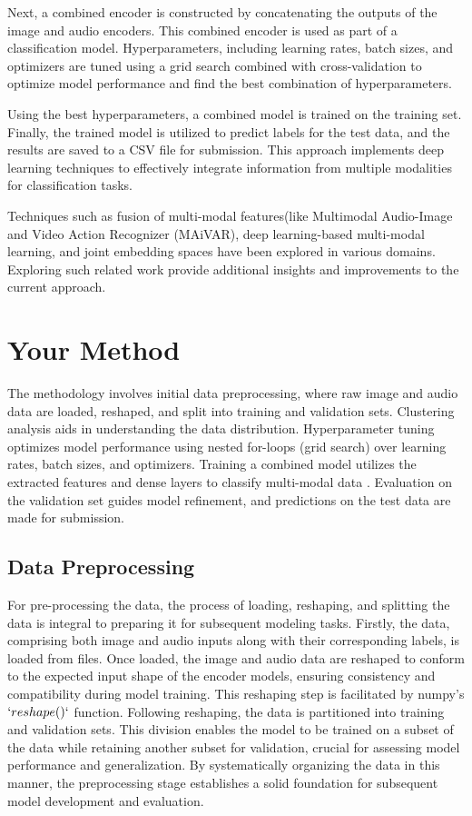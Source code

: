 \documentclass{article}
\begin{document}
Next, a combined encoder is constructed by concatenating the outputs of the image and audio encoders. This combined encoder is used as part of a classification model. Hyperparameters, including learning rates, batch sizes, and optimizers are tuned using a grid search combined with cross-validation to optimize model performance and find the best combination of hyperparameters.

Using the best hyperparameters, a combined model is trained on the training set. Finally, the trained model is utilized to predict labels for the test data, and the results are saved to a CSV file for submission. This approach implements deep learning techniques to effectively integrate information from multiple modalities for classification tasks.

 Techniques such as fusion of multi-modal features(like Multimodal Audio-Image and Video Action Recognizer (MAiVAR), deep learning-based multi-modal learning, and joint embedding spaces have been explored in various domains. Exploring such related work  provide additional insights and improvements to the current approach.

\section{Your Method}

The methodology involves initial data preprocessing, where raw image and audio data are loaded, reshaped, and split into training and validation sets. Clustering analysis aids in understanding the data distribution. Hyperparameter tuning optimizes model performance using nested for-loops (grid search) over learning rates, batch sizes, and optimizers. Training a combined model utilizes the extracted features and dense layers to classify multi-modal data . Evaluation on the validation set guides model refinement, and predictions on the test data are made for submission.
\subsection{Data Preprocessing}

For pre-processing the data, the process of loading, reshaping, and splitting the data is integral to preparing it for subsequent modeling tasks. Firstly, the data, comprising both image and audio inputs along with their corresponding labels, is loaded from files. Once loaded, the image and audio data are reshaped to conform to the expected input shape of the encoder models, ensuring consistency and compatibility during model training. This reshaping step is facilitated by numpy's $`reshape()`$ function. Following reshaping, the data is partitioned into training and validation sets. This division enables the model to be trained on a subset of the data while retaining another subset for validation, crucial for assessing model performance and generalization. By systematically organizing the data in this manner, the preprocessing stage establishes a solid foundation for subsequent model development and evaluation.
\end{document}
